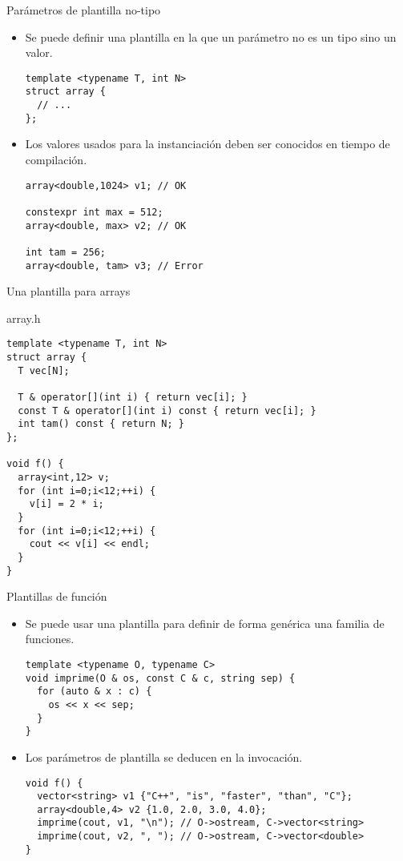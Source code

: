 \begin{frame}[t,fragile]{Parámetros de plantilla no-tipo}
\begin{itemize}
  \item Se puede definir una plantilla en la que un parámetro no es un tipo
        sino un valor.
\begin{lstlisting}[]
template <typename T, int N>
struct array {
  // ...
};
\end{lstlisting}
  \item Los valores usados para la instanciación deben ser conocidos en tiempo
        de compilación.
\begin{lstlisting}[]
array<double,1024> v1; // OK

constexpr int max = 512;
array<double, max> v2; // OK

int tam = 256;
array<double, tam> v3; // Error
\end{lstlisting}
\end{itemize}
\end{frame}

\begin{frame}[t,fragile]{Una plantilla para arrays}
\begin{block}{array.h}
\begin{lstlisting}[]
template <typename T, int N>
struct array {
  T vec[N];

  T & operator[](int i) { return vec[i]; }
  const T & operator[](int i) const { return vec[i]; }
  int tam() const { return N; }
};

void f() {
  array<int,12> v;
  for (int i=0;i<12;++i) {
    v[i] = 2 * i;
  }
  for (int i=0;i<12;++i) {
    cout << v[i] << endl;
  }
}
\end{lstlisting}
\end{block}
\end{frame}

\begin{frame}[t,fragile]{Plantillas de función}
\begin{itemize}
  \item Se puede usar una plantilla para definir de forma genérica una
        familia de funciones.
\begin{lstlisting}[]
template <typename O, typename C>
void imprime(O & os, const C & c, string sep) {
  for (auto & x : c) {
    os << x << sep;
  }
}
\end{lstlisting}
  \item Los parámetros de plantilla se deducen en la invocación.
\begin{lstlisting}[]
void f() {
  vector<string> v1 {"C++", "is", "faster", "than", "C"};
  array<double,4> v2 {1.0, 2.0, 3.0, 4.0};
  imprime(cout, v1, "\n"); // O->ostream, C->vector<string>
  imprime(cout, v2, ", "); // O->ostream, C->vector<double>
}
\end{lstlisting}
\end{itemize}
\end{frame}
